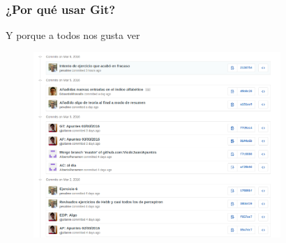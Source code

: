 \documentclass[10pt,compress,usetitleprogressbar,aspectratio=1610,mathserif,notes]{beamer}
\begin{document}
\begin{frame}
\frametitle{¿Por qué usar Git?}

Y porque a todos nos gusta ver
\begin{figure}[b]
\centering
\includegraphics[height = 200pt]{gitCommits.png}
\end{figure}
\end{frame}
\end{document}
